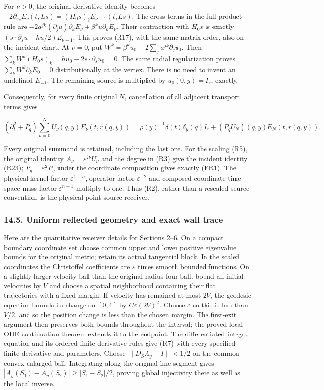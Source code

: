 \documentclass[
  11pt,
]{article}
\begin{document}
For \(\nu>0\), the original derivative identity becomes
\(-2\partial_{s_k}E_\nu(t,Ls)=(H_0s)_kE_{\nu-1}(t,Ls)\). The cross terms
in the full product rule are \(-2a^{jk}(\partial_j u)\partial_kE_\nu+
\beta^ku\partial_kE_\nu\). Their contraction with \(H_0s\) is exactly
\((s\cdot\partial_su-hu/2)E_{\nu-1}\). This proves (R17), with the same
matrix order, also on the incident chart. At \(\nu=0\), put
\(W^k=\beta^ku_0-2\sum_j a^{jk}\partial_j u_0\). Then
\(\sum_kW^k(H_0s)_k=hu_0-2s\cdot\partial_su_0=0\). The same radial
regularization proves \(\sum_kW^k\partial_kE_0=0\) distributionally at
the vertex. There is no need to invent an undefined \(E_{-1}\). The
remaining source is multiplied by \(u_0(0,y)=I_r\), exactly.

Consequently, for every finite original \(N\), cancellation of all
adjacent transport terms gives

\[
 (\partial_t^2+P_q)\sum_{\nu=0}^N
       U_\nu(q,y)E_\nu(t,r(q,y))
 =\rho(y)^{-1}\delta(t)\delta_y(q)I_r
             +(P_qU_N)(q,y)E_N(t,r(q,y)).\tag{FW13}
\]

Every original summand is retained, including the last one. For the
scaling (R5), the original identity \(A_\nu=\varepsilon^{2\nu}U_\nu\)
and the degree in (R3) give the incident identity (R23);
\(P_y=\varepsilon^2P_q\) under the coordinate composition gives exactly
(ER1). The physical kernel factor \(\varepsilon^{1-n}\), operator factor
\(\varepsilon^{-2}\) and composed coordinate time-space mass factor
\(\varepsilon^{n+1}\) multiply to one. Thus (R2), rather than a rescaled
source convention, is the physical point-source receiver.

\subsubsection{14.5. Uniform reflected geometry and exact wall
trace}\label{uniform-reflected-geometry-and-exact-wall-trace}

Here are the quantitative receiver details for Sections 2--6. On a
compact boundary coordinate set choose common upper and lower positive
eigenvalue bounds for the original metric; retain its actual tangential
block. In the scaled coordinates the Christoffel coefficients are
\(\varepsilon\) times smooth bounded functions. On a slightly larger
velocity ball than the original radius-four ball, bound all initial
velocities by \(V\) and choose a spatial neighborhood containing their
flat trajectories with a fixed margin. If velocity has remained at most
\(2V\), the geodesic equation bounds its change on \([0,1]\) by
\(C\varepsilon(2V)^2\). Choose \(\varepsilon\) so this is less than
\(V/2\), and so the position change is less than the chosen margin. The
first-exit argument then preserves both bounds throughout the interval;
the proved local ODE continuation theorem extends it to the endpoint.
The differentiated integral equation and its ordered finite derivative
rules give (R7) with every specified finite derivative and parameters.
Choose \(\|D_SA_y-I\|<1/2\) on the common convex enlarged ball.
Integrating along the original line segment gives
\(|A_y(S_1)-A_y(S_2)|\geq|S_1-S_2|/2\), proving global injectivity there
as well as the local inverse.
\end{document}
